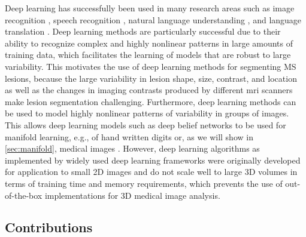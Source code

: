 Deep learning has successfully been used in many research areas such as image
recognition \citep{krizhevsky2012}, speech recognition \citep{hinton2012deep},
natural language understanding \citep{collobert2011natural}, and language
translation \citep{sutskever2014sequence}. Deep learning methods are
particularly successful due to their ability to recognize complex and highly
nonlinear patterns in large amounts of training data, which facilitates the
learning of models that are robust to large variability. This motivates the use
of deep learning methods for segmenting MS lesions, because the large
variability in lesion shape, size, contrast, and location as well as the changes
in imaging contrasts produced by different \gls{mri} scanners make lesion
segmentation challenging. Furthermore, deep learning methods can
be used to model highly nonlinear patterns of variability in groups of images.
This allows deep learning models such as deep belief networks to be used for
manifold learning, e.g., of hand written digits \citep{hinton2006b} or, as we
will show in \ref{sec:manifold}, medical images \citep{brosch2013}. However,
deep learning algorithms as implemented by widely used deep learning frameworks
were originally developed for application to small 2D images and do not scale
well to large 3D volumes in terms of training time and memory requirements,
which prevents the use of out-of-the-box implementations for 3D medical image
analysis.

\subsection{Contributions}

